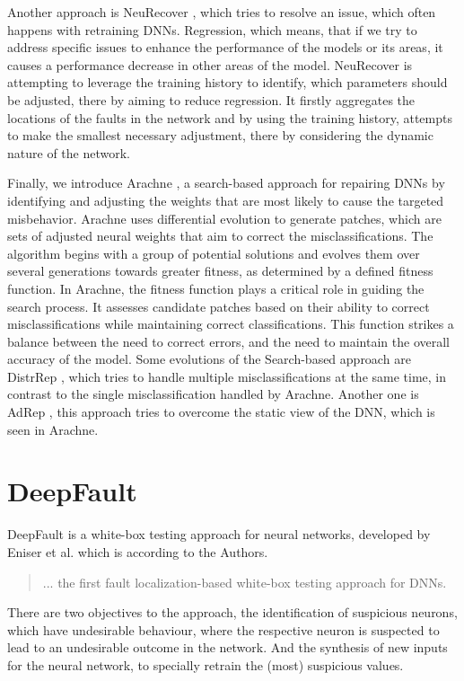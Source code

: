 Another approach is NeuRecover \cite{tokui_neurecover_2022}, which tries to resolve an issue, which often happens with retraining DNNs. Regression, which means, that if we try to address specific issues to enhance the performance of the models or its areas, it causes a performance decrease in other areas of the model.
NeuRecover is attempting to leverage the training history to identify, which parameters should be adjusted, there by aiming to reduce regression.
It firstly aggregates the locations of the faults in the network and by using the training history, attempts to make the smallest necessary adjustment, there by considering the dynamic nature of the network.

Finally, we introduce Arachne \cite{sohn_arachne_2023}, a search-based approach for repairing DNNs by identifying and adjusting the weights that are most likely to cause the targeted misbehavior.
Arachne uses differential evolution to generate patches, which are sets of adjusted neural weights that aim to correct the misclassifications.
The algorithm begins with a group of potential solutions and evolves them over several generations towards greater fitness, as determined by a defined fitness function.
In Arachne, the fitness function plays a critical role in guiding the search process.
It assesses candidate patches based on their ability to correct misclassifications while maintaining correct classifications.
This function strikes a balance between the need to correct errors, and the need to maintain the overall accuracy of the model.
Some evolutions of the Search-based approach are DistrRep \cite{calsi_distributed_2023}, which tries to handle multiple misclassifications at the same time, in contrast to the single misclassification handled by Arachne.
Another one is AdRep \cite{li_calsi_adaptive_2023}, this approach tries to overcome the static view of the DNN, which is seen in Arachne.

\section{DeepFault}\label{sec:deepfault}
DeepFault \cite{eniser_deepfault_2019} is a white-box testing approach for neural networks, developed by Eniser et al. which is according to the Authors.
\begin{quote}
    ... the first fault localization-based white-box testing approach for DNNs.
\end{quote}
There are two objectives to the approach, the identification of suspicious neurons, which have undesirable behaviour, where the respective neuron is suspected to lead to an undesirable outcome in the network.
And the synthesis of new inputs for the neural network, to specially retrain the (most) suspicious values.


